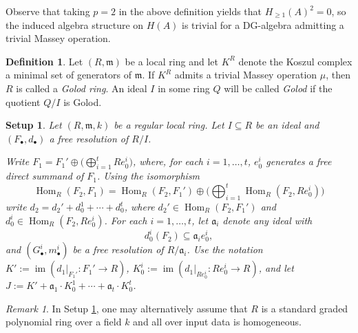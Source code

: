 \documentclass[10pt]{amsart}
\newtheorem{setup}[theorem]{Setup}
\theoremstyle{definition}
\newtheorem{definition}[theorem]{Definition}
\theoremstyle{remark}
\newtheorem{remark}[theorem]{Remark}
\newtheorem{the context}[theorem]{The Context}
\numberwithin{equation}{theorem}
\numberwithin{equation}{section}
\newcommand{\im}{\operatorname{Im}}
\newcommand{\ideal}[1]{\mathfrak{#1}}
\newcommand{\m}{\ideal{m}}
\renewcommand{\geq}{\geqslant}
\renewcommand{\hom}{\Hom}
\newcommand{\Hom}{\operatorname{Hom}}
\newcommand{\mfa}{\mathfrak{a}}
\def\im{\operatorname{im}}
\begin{document}
Observe that taking $p=2$ in the above definition yields that $H_{\geq 1} (A)^2 = 0$, so the induced algebra structure on $H(A)$ is trivial for a DG-algebra admitting a trivial Massey operation.

\begin{definition}\label{def:Golod}
Let $(R,\m)$ be a local ring and let $K^R$ denote the Koszul complex a minimal set of generators of $\m$. If $K^R$ admits a trivial Massey operation $\mu$, then $R$ is called a \emph{Golod ring}. An ideal $I$ in some ring $Q$ will be called \emph{Golod} if the quotient $Q/I$ is Golod.
\end{definition}


\begin{setup}\label{set:trimmingcxSetup}
Let $(R , \m , k)$ be a regular local ring. Let $I \subseteq R$ be an ideal and $(F_\bullet, d_\bullet)$ a free resolution of $R/I$. 

Write $F_1 = F_1' \oplus \Big( \bigoplus_{i=1}^t Re_0^i \Big)$, where, for each $i=1, \dotsc , t$, $e^i_0$ generates a free direct summand of $F_1$. Using the isomorphism
$$\hom_R (F_2 , F_1 ) = \hom_R (F_2,F_1') \oplus \Big( \bigoplus_{i=1}^t \hom_R (F_2 , Re^i_0) \Big)$$
write $d_2 = d_2' + d_0^1 + \cdots + d^t_0$, where $d_2' \in \hom_R (F_2,F_1')$ and $d^i_0 \in \hom_R (F_2 , Re^i_0)$.  For each $i=1, \dotsc , t$, let $\mfa_i$ denote any ideal with
$$d^i_0 (F_2) \subseteq \mfa_i e^i_0,$$
and $(G^i_\bullet , m^i_\bullet)$ be a free resolution of $R/\mfa_i$. Use the notation $K' := \im (d_1|_{F_1'} : F_1' \to R)$, $K^i_0 := \im (d_1|_{Re^i_0} : Re^i_0 \to R)$, and let $J := K' + \mfa_1 \cdot K^1_0+ \cdots + \mfa_t \cdot K_0^t$.
\end{setup}

\begin{remark}
In Setup \ref{set:trimmingcxSetup}, one may alternatively assume that $R$ is a standard graded polynomial ring over a field $k$ and all over input data is homogeneous.
\end{remark}
\end{document}
